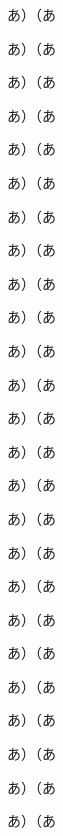 

あ）\inhibitglue （あ\par             %
あ）\relax\inhibitglue （あ\par       %
あ）\inhibitglue\relax （あ\par       %
あ）\relax\inhibitglue\relax （あ\par %
あ）\relax （あ\par                   %

あ）\inhibitglue （あ\par             %
あ）\null\inhibitglue （あ\par        %
あ）\inhibitglue\null （あ\par        %
あ）\null\inhibitglue\null （あ\par   %
あ）\null （あ\par                    %

あ）\inhibitglue （あ\par             %
あ）\vrule\inhibitglue （あ\par       %
あ）\inhibitglue\vrule （あ\par       %
あ）\vrule\inhibitglue\vrule （あ\par %
あ）\vrule （あ\par                   %

\def\disc{\discretionary{}{}{}}
あ）\inhibitglue （あ\par             %
あ）\disc\inhibitglue （あ\par        %
あ）\inhibitglue\disc （あ\par        %
あ）\disc\inhibitglue\disc （あ\par   %
あ）\disc （あ\par                    %

\def\zskip{\hskip0pt}
あ）\inhibitglue （あ\par             %
あ）\zskip\inhibitglue （あ\par       %
あ）\inhibitglue\zskip （あ\par       %
あ）\zskip\inhibitglue\zskip （あ\par %
あ）\zskip （あ\par                   %

\bye
